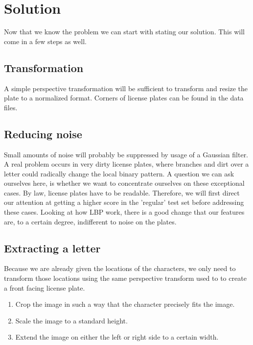 \documentclass[a4paper]{article}
\begin{document}
\section{Solution}

Now that we know the problem we can start with stating our solution. This will
come in a few steps as well.

\subsection{Transformation}

A simple perspective transformation will be sufficient to transform and resize 
the plate to a normalized format. Corners of license plates can be found in the
data files.

\subsection{Reducing noise}

Small amounts of noise will probably be suppressed by usage of a Gaussian
filter. A real problem occurs in very dirty license plates, where branches and
dirt over a letter could radically change the local binary pattern. A question
we can ask ourselves here, is whether we want to concentrate ourselves on
these exceptional cases. By law, license plates have to be readable. Therefore, 
we will first direct our attention at getting a higher score in the 'regular' 
test set before addressing these cases. Looking at how LBP work, there is a good 
change that our features are, to a certain degree, indifferent to noise on the 
plates.

\subsection{Extracting a letter}

Because we are already given the locations of the characters, we only need to 
transform those locations using the same perspective transform used to to
create a front facing license plate.

\begin{enumerate}
\item Crop the image in such a way that the character precisely fits the image.
\item Scale the image to a standard height.
\item Extend the image on either the left or right side to a certain width. 
\end{enumerate}
\end{document}
